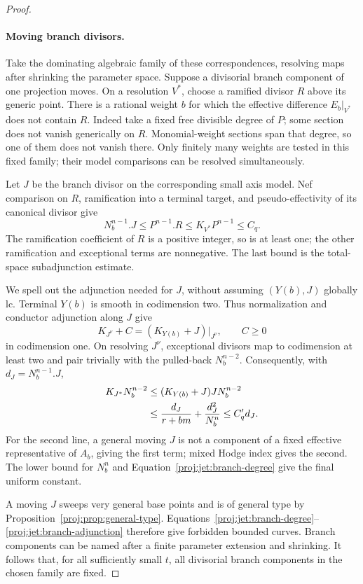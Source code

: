 \documentclass[11pt,letterpaper]{article}
\theoremstyle{definition}
\theoremstyle{remark}
\begin{document}
\begin{proof}
\paragraph{Moving branch divisors.}
Take the dominating algebraic family of these correspondences,
resolving maps after shrinking the parameter space.  Suppose a
divisorial branch component of one projection moves.  On a
resolution \(V^*\), choose a ramified divisor \(R\) above its generic
point.  There is a rational weight \(b\) for which the effective
difference \(E_b|_{V^*}\) does not contain \(R\).
Indeed take a fixed free divisible degree of \(P\); some section
does not vanish generically on \(R\).  Monomial-weight sections
span that degree, so one of them does not vanish there.
Only finitely many weights are tested in this fixed family; their
model comparisons can be resolved simultaneously.

Let \(J\) be the branch divisor on the corresponding small axis
model.  Nef comparison on \(R\), ramification into a terminal
target, and pseudo-effectivity of its canonical divisor give
\begin{equation}\label{proj:jet:branch-degree}
 N_b^{n-1}.J\le P^{n-1}.R
 \le K_{V^*}P^{n-1}\le C_q.
\end{equation}
The ramification coefficient of \(R\) is a positive integer, so is
at least one; the other ramification and exceptional terms are
nonnegative.  The last bound is the total-space subadjunction
estimate.

We spell out the adjunction needed for \(J\), without assuming
\((Y(b),J)\) globally lc.  Terminal \(Y(b)\) is smooth in codimension
two.  Thus normalization and conductor adjunction along \(J\)
give
\[
 K_{J^\nu}+C=(K_{Y(b)}+J)|_{J^\nu},\qquad C\ge0
\]
in codimension one.  On resolving \(J^\nu\), exceptional divisors
map to codimension at least two and pair trivially with the
pulled-back \(N_b^{n-2}\).  Consequently, with
\(d_J=N_b^{n-1}.J\),
\begin{align}
 K_{J^*}N_b^{n-2}
 &\le (K_{Y(b)}+J)J N_b^{n-2}\notag\\
 &\le \frac{d_J}{r+bm}+\frac{d_J^2}{N_b^n}
 \le C'_q d_J.\label{proj:jet:branch-adjunction}
\end{align}
For the second line, a general moving \(J\) is not a component of
a fixed effective representative of \(A_b\), giving the first
term; mixed Hodge index gives the second.  The lower bound for
\(N_b^n\) and Equation~\eqref{proj:jet:branch-degree} give the final
uniform constant.

A moving \(J\) sweeps very general base points and is of general
type by Proposition~\ref{proj:prop:general-type}.
Equations~\eqref{proj:jet:branch-degree}--\eqref{proj:jet:branch-adjunction}
therefore give forbidden bounded curves.  Branch components can
be named after a finite parameter extension and shrinking.
It follows that, for all sufficiently small \(t\), all divisorial
branch components in the chosen family are fixed.


\end{proof}
\end{document}
